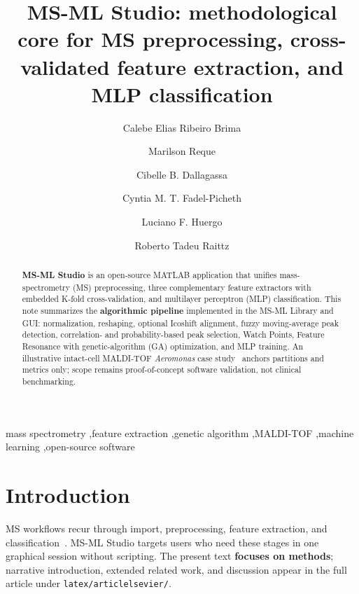 \documentclass[preprint,12pt]{elsarticle}
\begin{document}
\begin{frontmatter}

\title{MS-ML Studio: methodological core for MS preprocessing, cross-validated feature extraction, and MLP classification}

\address[addr1]{Departamento de Bioinform{\'a}tica, Universidade Federal do Paran{\'a}, Brazil}
\address[addr2]{Setor Litoral, Universidade Federal do Paran{\'a}, Brazil}
\address[addr3]{Departamento de Patologia M{\'e}dica, Universidade Federal do Paran{\'a}, Brazil}

\author[addr1]{Calebe Elias Ribeiro Brima}
\author[addr1]{Marilson Reque}
\author[addr3]{Cibelle B. Dallagassa}
\author[addr3]{Cyntia M. T. Fadel-Picheth}
\author[addr2]{Luciano F. Huergo}
\author[addr1]{Roberto Tadeu Raittz}

\begin{abstract}
\textbf{MS-ML Studio} is an open-source MATLAB application that unifies mass-spectrometry (MS) preprocessing, three complementary feature extractors with embedded K-fold cross-validation, and multilayer perceptron (MLP) classification. This note summarizes the \textbf{algorithmic pipeline} implemented in the MS-ML Library and GUI\@: normalization, reshaping, optional Icoshift alignment, fuzzy moving-average peak detection, correlation- and probability-based peak selection, Watch Points, Feature Resonance with genetic-algorithm (GA) optimization, and MLP training. An illustrative intact-cell MALDI-TOF \textit{Aeromonas} case study~\cite{Surek2010,Croxatto2012} anchors partitions and metrics only; scope remains proof-of-concept software validation, not clinical benchmarking.
\end{abstract}

\begin{keyword}
mass spectrometry \sep feature extraction \sep genetic algorithm \sep MALDI-TOF \sep machine learning \sep open-source software
\end{keyword}

\end{frontmatter}

\section{Introduction}
MS workflows recur through import, preprocessing, feature extraction, and classification~\cite{Krishnamurthy1996,Croxatto2012,Pluskal2010}. MS-ML Studio targets users who need these stages in one graphical session without scripting. The present text \textbf{focuses on methods}; narrative introduction, extended related work, and discussion appear in the full article under \texttt{latex/articlelsevier/}.
\end{document}

